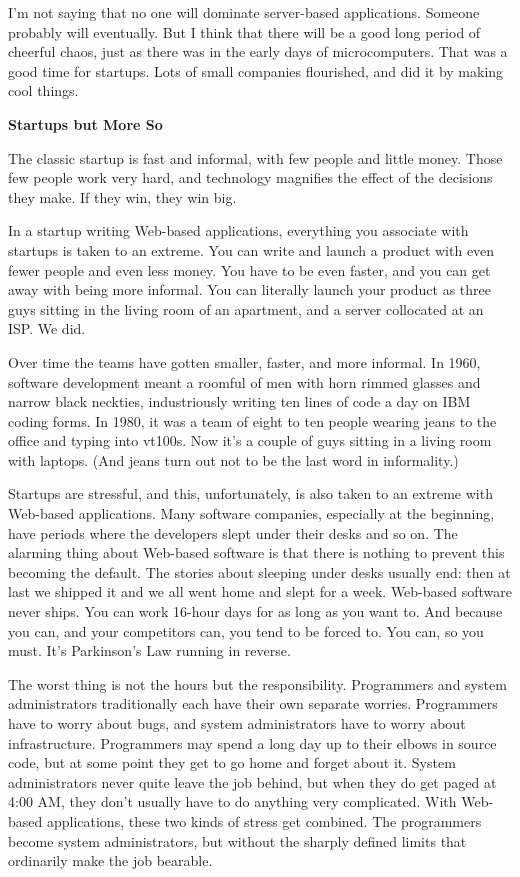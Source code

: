 I'm not saying that no one will dominate server-based applications.
Someone probably will eventually. But I think that there will be a good
long period of cheerful chaos, just as there was in the early days of
microcomputers. That was a good time for startups. Lots of small
companies flourished, and did it by making cool things.

\textbf{Startups but More So}

The classic startup is fast and informal, with few people and little
money. Those few people work very hard, and technology magnifies the
effect of the decisions they make. If they win, they win big.

In a startup writing Web-based applications, everything you associate
with startups is taken to an extreme. You can write and launch a product
with even fewer people and even less money. You have to be even faster,
and you can get away with being more informal. You can literally launch
your product as three guys sitting in the living room of an apartment,
and a server collocated at an ISP. We did.

Over time the teams have gotten smaller, faster, and more informal. In
1960, software development meant a roomful of men with horn rimmed
glasses and narrow black neckties, industriously writing ten lines of
code a day on IBM coding forms. In 1980, it was a team of eight to ten
people wearing jeans to the office and typing into vt100s. Now it's a
couple of guys sitting in a living room with laptops. (And jeans turn
out not to be the last word in informality.)

Startups are stressful, and this, unfortunately, is also taken to an
extreme with Web-based applications. Many software companies, especially
at the beginning, have periods where the developers slept under their
desks and so on. The alarming thing about Web-based software is that
there is nothing to prevent this becoming the default. The stories about
sleeping under desks usually end: then at last we shipped it and we all
went home and slept for a week. Web-based software never ships. You can
work 16-hour days for as long as you want to. And because you can, and
your competitors can, you tend to be forced to. You can, so you must.
It's Parkinson's Law running in reverse.

The worst thing is not the hours but the responsibility. Programmers and
system administrators traditionally each have their own separate
worries. Programmers have to worry about bugs, and system administrators
have to worry about infrastructure. Programmers may spend a long day up
to their elbows in source code, but at some point they get to go home
and forget about it. System administrators never quite leave the job
behind, but when they do get paged at 4:00 AM, they don't usually have
to do anything very complicated. With Web-based applications, these two
kinds of stress get combined. The programmers become system
administrators, but without the sharply defined limits that ordinarily
make the job bearable.

